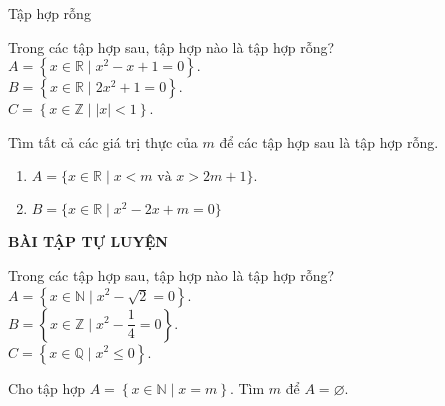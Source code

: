 \setcounter{bt}{0}
\setcounter{vd}{0}
\begin{dang}{Tập hợp rỗng}
\end{dang}
\begin{vd}%
Trong các tập hợp sau, tập hợp nào là tập hợp rỗng?\\
$A=\left\lbrace x\in \mathbb{R}\mid x^2-x+1=0 \right\rbrace.$\\
$B=\left\lbrace x\in \mathbb{R} \mid 2x^2+1=0\right\rbrace.$\\
$C=\left\lbrace x\in \mathbb{Z}\mid |x|<1\right\rbrace $.
\end{vd}

\begin{vd}
Tìm tất cả các giá trị thực của $m$ để các tập hợp sau là tập hợp rỗng.
\begin{enumerate}
	\item $A=\{x\in \mathbb{R} \mid x <m \text{ và } x>2m+1 \}.$
	\item $B=\{x\in \mathbb{R} \mid x^2-2x+m=0\}$
\end{enumerate}
\end{vd}


\begin{center}
\textbf{BÀI TẬP TỰ LUYỆN}
\end{center}
\begin{bt}%
Trong các tập hợp sau, tập hợp nào là tập hợp rỗng?\\
$A=\left\lbrace x\in \mathbb{N}\mid x^2-\sqrt{2}=0\right\rbrace$.\\
$B=\left\lbrace x\in \mathbb{Z}\mid  x^2-\dfrac{1}{4}=0\right\rbrace$.\\
$C=\left\lbrace x\in \mathbb{Q}\mid x^2\leq 0\right\rbrace$.
\end{bt}

\begin{bt}%
Cho tập hợp $A=\left\lbrace x\in \mathbb{N}\mid x=m\right\rbrace.$ Tìm $m$ để $A=\varnothing$.
\end{bt}

